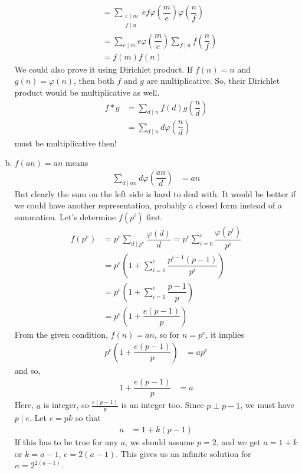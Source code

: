 \documentclass[problems.tex]{subfile}
\begin{document}
\begin{solution}
\begin{enumerate}[(a)]
\begin{align*}
								  & = \sum_{\substack{e\mid m\\f\mid n}}ef\varphi\left(\dfrac{m}{e}\right)\varphi\left(\dfrac{n}{f}\right)\\
								  & = \sum_{e\mid m}e\varphi\left(\dfrac{m}{e}\right)\sum_{f\mid n}f\left(\dfrac{n}{f}\right)\\
								  & = f(m)f(n)
						\end{align*}
					We could also prove it using Dirichlet product. If $f(n)=n$ and $g(n)=\varphi(n)$, then both $f$ and $g$ are multiplicative. So, their Dirichlet product would be multiplicative as well.
						\begin{align*}
							f\ast g & = \sum_{d\mid n}f(d)g\left(\dfrac{n}{d}\right)\\
									& = \sum_{d\mid n}d\varphi\left(\dfrac{n}{d}\right)
						\end{align*}
					must be multiplicative then!
				\item $f(an)=an$ means
						\begin{align*}
							\sum_{d\mid an}d\varphi\left(\dfrac{an}{d}\right) & = an
						\end{align*}
					But clearly the sum on the left side is hard to deal with. It would be better if we could have another representation, probably a closed form instead of a summation. Let's determine $f(p^i)$ first.
						\begin{align*}
							f(p^e)  & = p^e\sum_{d\mid p^e}\dfrac{\varphi(d)}{d} = p^e\sum_{i=0}^{e}\dfrac{\varphi(p^i)}{p^i}\\
									& = p^e\left(1+\sum_{i=1}^{e}\dfrac{p^{i-1}(p-1)}{p^i}\right)\\
									& = p^e\left(1+\sum_{i=1}^{e}\dfrac{p-1}{p}\right)\\
									& = p^e\left(1+\dfrac{e(p-1)}{p}\right)
						\end{align*}
					From the given condition, $f(n) = an$, so for $n=p^e$, it implies
						\begin{align*}
							p^e\left(1+\dfrac{e(p-1)}{p}\right) & = ap^e
						\end{align*}
					and so,
						\begin{align*}
							1+\dfrac{e(p-1)}{p} & = a
						\end{align*}
					Here, $a$ is integer, so $\frac{e(p-1)}{p}$ is an integer too. Since $p\perp p-1$, we must have $p\mid e$. Let $e=pk$ so that
						\begin{align*}
							a & = 1+k(p-1)
						\end{align*}
					If this has to be true for any $a$, we should assume $p=2$, and we get $a=1+k$ or $k=a-1$, $e=2(a-1)$. This gives us an infinite solution for $n=2^{2(a-1)}$.
			\end{enumerate}
	\end{solution}
\end{document}
